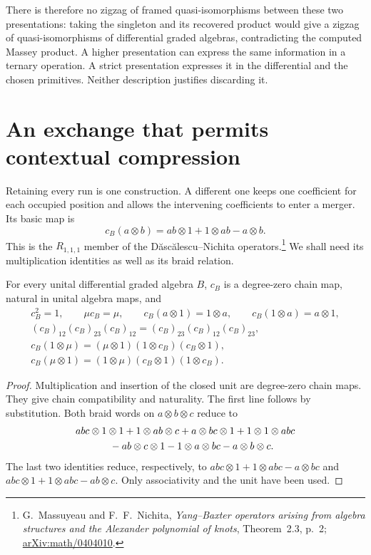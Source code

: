 There is therefore no zigzag of framed quasi-isomorphisms
between these two presentations: taking the singleton
and its recovered product would give a zigzag of
quasi-isomorphisms of differential graded algebras,
contradicting the computed Massey product.
A higher presentation can express the same information
in a ternary operation. A strict presentation expresses
it in the differential and the chosen primitives.
Neither description justifies discarding it.

\section{An exchange that permits contextual compression}
\label{v4-sec:regular-contextual-exchange}

Retaining every run is one construction. A different one
keeps one coefficient for each occupied position and
allows the intervening coefficients to enter a merger.
Its basic map is
\begin{equation}\label{v4-eq:regular-exchange}
 c_B(a\otimes b)=ab\otimes1+1\otimes ab-a\otimes b.
\end{equation}
This is the \(R_{1,1,1}\) member of the
D\u{a}sc\u{a}lescu--Nichita operators.\footnote{
G.~Massuyeau and F.~F.~Nichita,
\emph{Yang--Baxter operators arising from algebra
structures and the Alexander polynomial of knots},
Theorem~2.3, p.~2;
\href{https://arxiv.org/abs/math/0404010}{arXiv:math/0404010}.}
We shall need its multiplication identities as well as
its braid relation.

\begin{lemma}\label{v4-lem:regular-contextual-exchange}
For every unital differential graded algebra \(B\),
\(c_B\) is a degree-zero chain map, natural in unital
algebra maps, and
\[
 \begin{gathered}
 c_B^2=1,\qquad \mu c_B=\mu,\qquad
 c_B(a\otimes1)=1\otimes a,\qquad
 c_B(1\otimes a)=a\otimes1,\\
 (c_B)_{12}(c_B)_{23}(c_B)_{12}
       =(c_B)_{23}(c_B)_{12}(c_B)_{23},\\
 c_B(1\otimes\mu)
       =(\mu\otimes1)(1\otimes c_B)(c_B\otimes1),\\
 c_B(\mu\otimes1)
       =(1\otimes\mu)(c_B\otimes1)(1\otimes c_B).
 \end{gathered}
\]
\end{lemma}

\begin{proof}
Multiplication and insertion of the closed unit are
degree-zero chain maps. They give chain compatibility
and naturality. The first line follows by substitution.
Both braid words on \(a\otimes b\otimes c\) reduce to
\[
 \begin{split}
 &abc\otimes1\otimes1+1\otimes ab\otimes c
       +a\otimes bc\otimes1+1\otimes1\otimes abc\\
 &\hspace{12mm}
       -ab\otimes c\otimes1-1\otimes a\otimes bc
       -a\otimes b\otimes c.
 \end{split}
\]
The last two identities reduce, respectively, to
\(abc\otimes1+1\otimes abc-a\otimes bc\) and
\(abc\otimes1+1\otimes abc-ab\otimes c\).
Only associativity and the unit have been used.
\end{proof}

